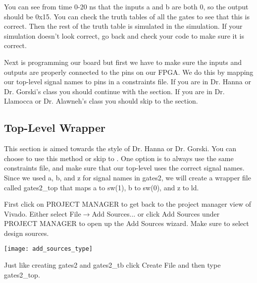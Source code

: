 You can see from time 0-20 ns that the inputs a and b are both 0, so the output should be 0x15.
You can check the truth tables of all the gates to see that this is correct.
Then the rest of the truth table is simulated in the simulation.
If your simulation doesn't look correct, go back and check your code to make sure it is correct.

Next is programming our board but first we have to make sure the inputs and outputs are properly
connected to the pins on our FPGA.
We do this by mapping our top-level signal names to pins in a constraints file.
If you are in Dr. Hanna or Dr. Gorski's class you should continue with the
 section.
If you are in Dr. Llamocca or Dr. Alawneh's class you should skip to the  section.

\subsection{Top-Level Wrapper}
\label{sec:toplevel}
This section is aimed towards the style of Dr. Hanna or Dr. Gorski.
You can choose to use this method or skip to .
One option is to always use the same constraints file, and make sure that our top-level uses
the correct signal names.
Since we used a, b, and z for signal names in gates2, we will create a wrapper file called
gates2\_top that maps a to sw(1), b to sw(0), and z to ld.

First click on PROJECT MANAGER to get back to the project manager view of Vivado.
Either select File$\rightarrow$Add Sources... or click Add Sources under PROJECT MANAGER to
open up the Add Sources wizard. Make sure to select design sources.

\begin{center}
    \texttt{[image: add\_sources\_type]}
\end{center}

Just like creating gates2 and gates2\_tb click Create File and then type gates2\_top.

\begin{center}
\end{center}

